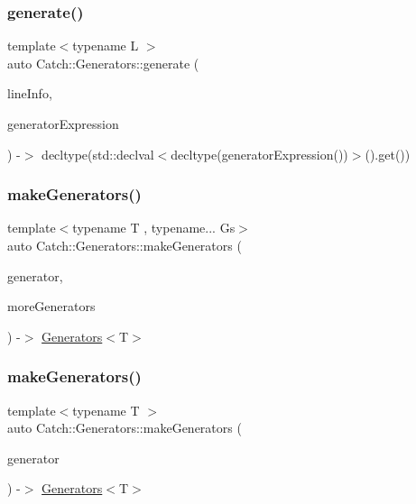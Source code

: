 \subsubsection{\texorpdfstring{generate()}{generate()}}
{\footnotesize\ttfamily template$<$typename L $>$ \\
auto Catch\+::\+Generators\+::generate (\begin{DoxyParamCaption}\item[{\mbox{\hyperlink{struct_catch_1_1_source_line_info}{Source\+Line\+Info}} const \&}]{line\+Info,  }\item[{L const \&}]{generator\+Expression }\end{DoxyParamCaption}) -\/$>$ decltype(std\+::declval$<$decltype(generator\+Expression())$>$().get()) }

\mbox{\label{namespace_catch_1_1_generators_a7cc95d72b060e2819b2edbbdbf8c646b}} 
\subsubsection{\texorpdfstring{make\+Generators()}{makeGenerators()}\hspace{0.1cm}{\footnotesize\ttfamily [1/4]}}
{\footnotesize\ttfamily template$<$typename T , typename... Gs$>$ \\
auto Catch\+::\+Generators\+::make\+Generators (\begin{DoxyParamCaption}\item[{\mbox{\hyperlink{class_catch_1_1_generators_1_1_generator_wrapper}{Generator\+Wrapper}}$<$ T $>$ \&\&}]{generator,  }\item[{Gs \&\&...}]{more\+Generators }\end{DoxyParamCaption}) -\/$>$ \mbox{\hyperlink{class_catch_1_1_generators_1_1_generators}{Generators}}$<$T$>$ }

\mbox{\label{namespace_catch_1_1_generators_abefb1a0fab3c669b98a53037b3286d22}} 
\subsubsection{\texorpdfstring{make\+Generators()}{makeGenerators()}\hspace{0.1cm}{\footnotesize\ttfamily [2/4]}}
{\footnotesize\ttfamily template$<$typename T $>$ \\
auto Catch\+::\+Generators\+::make\+Generators (\begin{DoxyParamCaption}\item[{\mbox{\hyperlink{class_catch_1_1_generators_1_1_generator_wrapper}{Generator\+Wrapper}}$<$ T $>$ \&\&}]{generator }\end{DoxyParamCaption}) -\/$>$ \mbox{\hyperlink{class_catch_1_1_generators_1_1_generators}{Generators}}$<$T$>$ }

